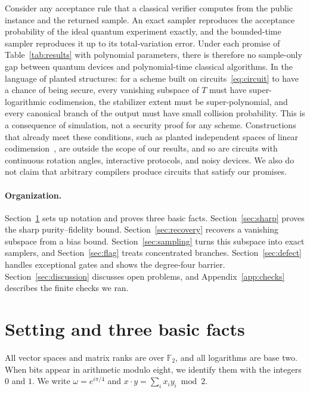 \documentclass[a4paper,onecolumn,11pt,unpublished]{quantumarticle}
\theoremstyle{plain}
\theoremstyle{remark}
\newcommand{\F}{\mathbb{F}_2}
\begin{document}
Consider any acceptance rule that a classical verifier computes from the public instance and the returned sample. An exact sampler reproduces the acceptance probability of the ideal quantum experiment exactly, and the bounded-time sampler reproduces it up to its total-variation error. Under each promise of Table~\ref{tab:results} with polynomial parameters, there is therefore no sample-only gap between quantum devices and polynomial-time classical algorithms. In the language of planted structures: for a scheme built on circuits~\eqref{eq:circuit} to have a chance of being secure, every vanishing subspace of $T$ must have super-logarithmic codimension, the stabilizer extent must be super-polynomial, and every canonical branch of the output must have small collision probability. This is a consequence of simulation, not a security proof for any scheme. Constructions that already meet these conditions, such as planted independent spaces of linear codimension~\cite{BGHLQ26}, are outside the scope of our results, and so are circuits with continuous rotation angles, interactive protocols, and noisy devices. We also do not claim that arbitrary compilers produce circuits that satisfy our promises.

\paragraph{Organization.}
Section~\ref{sec:setting} sets up notation and proves three basic facts. Section~\ref{sec:sharp} proves the sharp purity--fidelity bound. Section~\ref{sec:recovery} recovers a vanishing subspace from a bias bound. Section~\ref{sec:sampling} turns this subspace into exact samplers, and Section~\ref{sec:flag} treats concentrated branches. Section~\ref{sec:defect} handles exceptional gates and shows the degree-four barrier. Section~\ref{sec:discussion} discusses open problems, and Appendix~\ref{app:checks} describes the finite checks we ran.

\section{Setting and three basic facts}\label{sec:setting}

All vector spaces and matrix ranks are over $\F$, and all logarithms are base two. When bits appear in arithmetic modulo eight, we identify them with the integers $0$ and $1$. We write $\omega=e^{i\pi/4}$ and $x\cdot y=\sum_ix_iy_i \bmod 2$.
\end{document}
